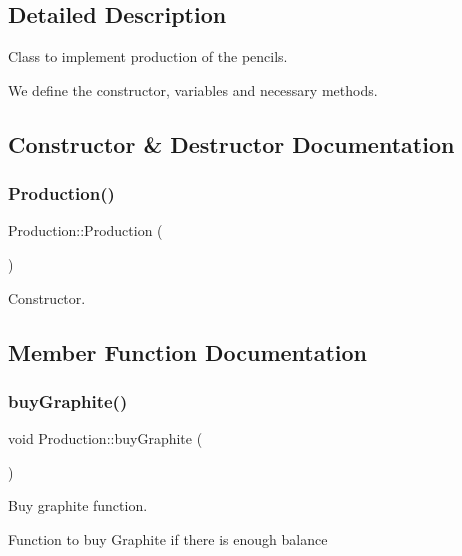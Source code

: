 \subsection{Detailed Description}
Class to implement production of the pencils. 

We define the constructor, variables and necessary methods. 

\subsection{Constructor \& Destructor Documentation}
\mbox{\label{classProduction_a12c7c685be71ed51ac10f7d0284e8d4f}} 
\subsubsection{\texorpdfstring{Production()}{Production()}}
{\footnotesize\ttfamily Production\+::\+Production (\begin{DoxyParamCaption}{ }\end{DoxyParamCaption})}

Constructor. 

\subsection{Member Function Documentation}
\mbox{\label{classProduction_adf62fb3241254aa3412ed9a9d1fb27a2}} 
\subsubsection{\texorpdfstring{buy\+Graphite()}{buyGraphite()}}
{\footnotesize\ttfamily void Production\+::buy\+Graphite (\begin{DoxyParamCaption}{ }\end{DoxyParamCaption})}

Buy graphite function.

Function to buy Graphite if there is enough balance \mbox{\label{classProduction_a5eea7af1f4949832bcc0c019f420d655}} 
